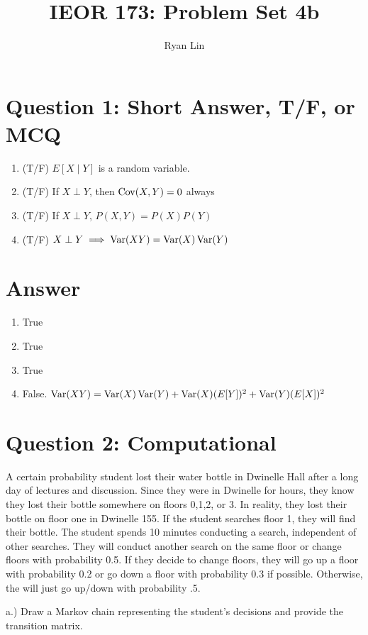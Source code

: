\documentclass{report}
\title{IEOR 173: Problem Set 4b}
\author{Ryan Lin}
\date{}
\begin{document}
\maketitle
\section*{Question 1: Short Answer, T/F, or MCQ}

\begin{enumerate}
	\item (T/F) $ E[X \mid Y] $ is a random variable. 
	\item (T/F) If $ X \perp Y $, then $ \operatorname{Cov}(X,Y) = 0 $ always
	\item (T/F) If $ X \perp Y $,  $ P(X,Y) = P(X)P(Y)$
	\item (T/F) $ X \perp Y \implies \operatorname{Var}(XY) = \operatorname{Var}(X)\operatorname{Var}(Y) $  
\end{enumerate}

\section*{Answer}

\begin{enumerate}
	\item True
	\item True
	\item True
	\item False. $ \operatorname{Var}(XY) = \operatorname{Var}(X)\operatorname{Var}(Y) + \operatorname{Var}(X)(E[Y])^{2} + \operatorname{Var}(Y)(E[X])^{2} $ 
\end{enumerate}

\section{Question 2: Computational}
A certain probability student lost their water bottle in Dwinelle Hall after  a long day of lectures and discussion. Since they were in Dwinelle for hours, they know they lost their bottle somewhere on floors 0,1,2, or 3. In reality, they lost their bottle on floor one in Dwinelle 155. If the student searches floor 1, they will find their bottle. The student spends 10 minutes conducting a search, independent of other searches. They will conduct another search on the same floor or change floors with probability 0.5. If they decide to change floors, they will go up a floor with probability 0.2 or go down a floor with probability 0.3 if possible. Otherwise, the will just go up/down with probability .5.

a.) Draw a Markov chain representing the student's decisions and provide the transition matrix. 
\end{document}
